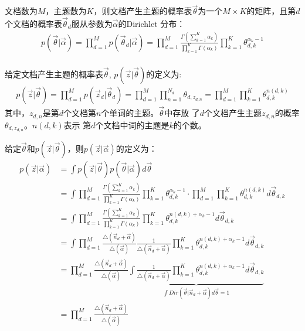 文档数为$M$，主题数为$K$，则文档产生主题的概率表$\vec{\theta}$为一个$M
\times K$的矩阵，且第$d$个文档的概率表$\vec{\theta}_d$服从参数为$\vec{\alpha}$的Dirichlet
分布：
\begin{displaymath}
\begin{split}
p(\vec{\theta}|\vec{\alpha}) 
= \prod_{d=1}^{M}{p(\vec{\theta}_d|\vec{\alpha})} 
=\prod_{d=1}^{M}{\frac{\Gamma(\sum_{k=1}^{K}{\alpha_k})}{\prod_{k=1}^{K}{\Gamma(\alpha_k)}}\prod_{k=1}^{K}{\theta_{d,k}^{\alpha_k-1}}} \\
\end{split}
\end{displaymath} 


给定文档产生主题的概率表$\vec{\theta}$, $p(\vec{z}|\vec{\theta})$的定义为:
\begin{displaymath}
\begin{split}
p(\vec{z}|\vec{\theta})
= \prod_{d=1}^{M}{p(\vec{z}_d|\vec{\theta}_d)}
= \prod_{d=1}^{M}{\prod_{n=1}^{N_d}{\theta_{d,z_{d,n}}}}
=\prod_{d=1}^{M}{\prod_{k=1}^{K}{\theta_{d,k}^{n(d,k)}}}
\end{split}
\end{displaymath}
其中，$z_{d,n}$是第$d$个文档第$n$个单词的主题。$\vec{\theta}$中存放
了$d$个文档产生主题$z_{d,n}$的概率$\theta_{d,z_{d,n}}$。$n(d,k)$表示
第$d$个文档中词的主题是$k$的个数。

给定$\vec{\theta}$和$p(\vec{z}|\vec{\theta})$，则$p(\vec{z}|\vec{\alpha})$的定义为：
\begin{displaymath}
\begin{split}
p(\vec{z}|\vec{\alpha}) 
&= \int{p(\vec{z}|\vec{\theta})p(\vec{\theta}|\vec{\alpha})d\vec{\theta}}\\
&= \int{
     \prod_{d=1}^{M}{\frac{\Gamma(\sum_{k=1}^{K}{\alpha_k})}{\prod_{k=1}^{K}{\Gamma(\alpha_k)}}\prod_{k=1}^{K}{\theta_{d,k}^{\alpha_k-1}}}
     \cdot
     \prod_{d=1}^{M}{\prod_{k=1}^{K}{\theta_{d,k}^{n(d,k)}}}
d\vec{\theta}_{d,k}}\\
&= \int{
     \prod_{d=1}^{M}{\frac{\Gamma(\sum_{k=1}^{K}{\alpha_k})}{\prod_{k=1}^{K}{\Gamma(\alpha_k)}}
       \prod_{k=1}^{K}{\theta_{d,k}^{n(d,k)+\alpha_k -1}}
     }
d\vec{\theta}_{d,k}}\\
&= \int{
     \prod_{d=1}^{M}{
       \frac{\triangle(\vec{n}_d+\vec{\alpha})}{\triangle(\vec{\alpha})}
       \frac{1}{\triangle(\vec{n}_d+\vec{\alpha})}
       \prod_{k=1}^{K}{\theta_{d,k}^{n(d,k)+\alpha_k -1}}
     }
d\vec{\theta}_{d,k}}\\
&= \prod_{d=1}^{M}{\frac{\triangle(\vec{n}_d+\vec{\alpha})}{\triangle(\vec{\alpha})}
\underbrace{
    \int{
       \frac{1}{\triangle(\vec{n}_d+\vec{\alpha})}
       \prod_{k=1}^{K}{\theta_{d,k}^{n(d,k)+\alpha_k -1}}
     d\vec{\theta}_{d,k}}
}_{\int{Dir(\vec{\theta}|\vec{n}_d + \vec{\alpha})d\vec{\theta}}=1}
}\\
&= \prod_{d=1}^{M}{\frac{\triangle(\vec{n}_d+\vec{\alpha})}{\triangle(\vec{\alpha})}}\\
\end{split}
\end{displaymath} 

